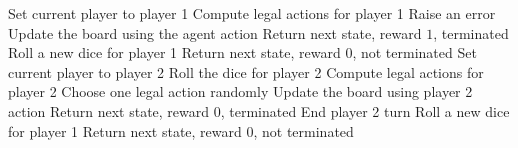 \begin{algorithm}[H]
\caption{Step function}
\begin{algorithmic}[1]
\State Set current player to player 1
\State Compute legal actions for player 1
    \State Raise an error
\EndIf
\State Update the board using the agent action
    \State Return next state, reward $1$, terminated
    \State Roll a new dice for player 1
    \State Return next state, reward $0$, not terminated
\Else
    \State Set current player to player 2
        \State Roll the dice for player 2
        \State Compute legal actions for player 2
        \State Choose one legal action randomly
        \State Update the board using player 2 action
            \State Return next state, reward $0$, terminated
            \State End player 2 turn
        \EndIf
    \EndWhile
    \State Roll a new dice for player 1
    \State Return next state, reward $0$, not terminated
\EndIf
\end{algorithmic}
\end{algorithm}
